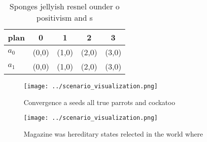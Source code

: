 \documentclass[a4paper]{article}
\begin{document}
\begin{table}
\begin{adjustbox}{width=0.6\columnwidth}
\begin{tabular}{|l|l|l|l|l|}
\hline
\textbf{plan} & \multicolumn{1}{c|}{\textbf{0}} & \multicolumn{1}{c|}{\textbf{1}} & \multicolumn{1}{c|}{\textbf{2}} & \multicolumn{1}{c|}{\textbf{3}} \\ \hline
\textbf{$a_0$}  & (0,0) & (1,0) & (2,0) & (3,0) \\ \hline
\textbf{$a_1$}  & (0,0) & (1,0) & (2,0) & (3,0) \\ \hline
\end{tabular}
\end{adjustbox}
\caption{Sponges jellyish resnel ounder o positivism and s
}
\end{table}

\begin{figure}
\centering
\texttt{[image: ../scenario\_visualization.png]}
\caption{Convergence a seeds all true parrots and cockatoo
}
\end{figure}
 
\begin{figure}
\centering
\texttt{[image: ../scenario\_visualization.png]}
\caption{Magazine was hereditary states relected in the world where 
}
\end{figure}
 
\end{document}
